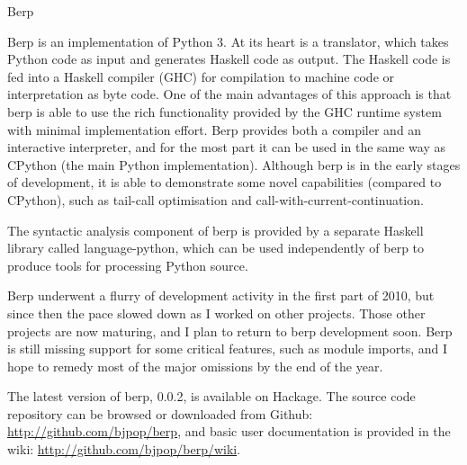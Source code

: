 \documentclass{scrreprt}
\begin{document}
\begin{hcarentry}{Berp}
\makeheader

Berp is an implementation of Python 3. At its heart is a translator,
which takes Python code as input and generates Haskell code as output.
The Haskell code is fed into a Haskell compiler (GHC) for compilation
to machine code or interpretation as byte code. One of the main advantages
of this approach is that berp is able to use the rich
functionality provided by the GHC runtime system with minimal
implementation effort.
Berp provides both a compiler and an interactive interpreter, and for the
most part it can be used in the same way as CPython (the main Python
implementation). Although berp is in the early stages of development,
it is able to demonstrate some novel capabilities (compared to CPython),
such as tail-call optimisation and call-with-current-continuation.

The syntactic analysis component of berp is provided by a separate Haskell
library called language-python, which can be used independently of berp to
produce tools for processing Python source.

Berp underwent a flurry of development activity in the first part of 2010,
but since then the pace slowed down as I worked on other projects.
Those other projects are now maturing, and I plan to return
to berp development soon. Berp is still missing support
for some critical features, such as module imports, and I hope to
remedy most of the major omissions by the end of the year.

\FurtherReading
The latest version of berp, 0.0.2, is available on Hackage.
The source code repository can be browsed or downloaded from Github:
\url{http://github.com/bjpop/berp}, and basic user documentation is
provided in the wiki: \url{http://github.com/bjpop/berp/wiki}.

\end{hcarentry}
\end{document}

